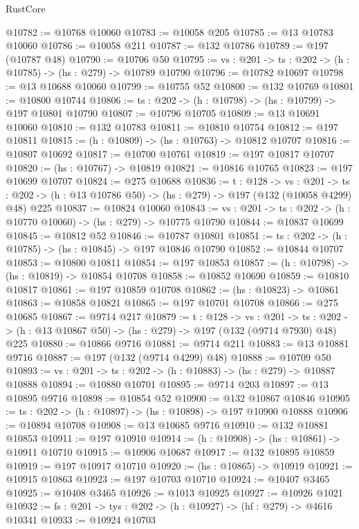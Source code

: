 \begin{lexlean}{RustCore}
\begin{coremodule}
@10782 := @10768 @10060
@10783 := @10058 @205
@10785 := @13 @10783 @10060
@10786 := @10058 @211
@10787 := @132 @10786
@10789 := @197 (@10787 @48)
@10790 := @10706 @50
@10795 := {vs : @201} -> {ts : @202} -> (h : @10785) -> (hs : @279) -> @10789 @10790
@10796 := @10782 @10697
@10798 := @13 @10688 @10060
@10799 := @10755 @52
@10800 := @132 @10769
@10801 := @10800 @10744
@10806 := {ts : @202} -> (h : @10798) -> (hs : @10799) -> @197 @10801 @10790
@10807 := @10796 @10705
@10809 := @13 @10691 @10060
@10810 := @132 @10783
@10811 := @10810 @10754
@10812 := @197 @10811
@10815 := (h : @10809) -> (hs : @10763) -> @10812 @10707
@10816 := @10807 @10692
@10817 := @10700 @10761
@10819 := @197 @10817 @10707
@10820 := (hs : @10767) -> @10819
@10821 := @10816 @10765
@10823 := @197 @10699 @10707
@10824 := @275 @10688
@10836 := {t : @128} ->
  {vs : @201} ->
  {ts : @202} -> (h : @13 @10786 @50) -> (hs : @279) -> @197 (@132 (@10058 @4299) @48) @225
@10837 := @10824 @10060
@10843 := {vs : @201} -> {ts : @202} -> (h : @10770 @10060) -> (hs : @279) -> @10775 @10790
@10844 := @10837 @10699
@10845 := @10812 @52
@10846 := @10787 @10801
@10851 := {ts : @202} -> (h : @10785) -> (hs : @10845) -> @197 @10846 @10790
@10852 := @10844 @10707
@10853 := @10800 @10811
@10854 := @197 @10853
@10857 := (h : @10798) -> (hs : @10819) -> @10854 @10708
@10858 := @10852 @10690
@10859 := @10810 @10817
@10861 := @197 @10859 @10708
@10862 := (hs : @10823) -> @10861
@10863 := @10858 @10821
@10865 := @197 @10701 @10708
@10866 := @275 @10685
@10867 := @9714 @217
@10879 := {t : @128} ->
  {vs : @201} ->
  {ts : @202} -> (h : @13 @10867 @50) -> (hs : @279) -> @197 (@132 (@9714 @7930) @48) @225
@10880 := @10866 @9716
@10881 := @9714 @211
@10883 := @13 @10881 @9716
@10887 := @197 (@132 (@9714 @4299) @48)
@10888 := @10709 @50
@10893 := {vs : @201} -> {ts : @202} -> (h : @10883) -> (hs : @279) -> @10887 @10888
@10894 := @10880 @10701
@10895 := @9714 @203
@10897 := @13 @10895 @9716
@10898 := @10854 @52
@10900 := @132 @10867 @10846
@10905 := {ts : @202} -> (h : @10897) -> (hs : @10898) -> @197 @10900 @10888
@10906 := @10894 @10708
@10908 := @13 @10685 @9716
@10910 := @132 @10881 @10853
@10911 := @197 @10910
@10914 := (h : @10908) -> (hs : @10861) -> @10911 @10710
@10915 := @10906 @10687
@10917 := @132 @10895 @10859
@10919 := @197 @10917 @10710
@10920 := (hs : @10865) -> @10919
@10921 := @10915 @10863
@10923 := @197 @10703 @10710
@10924 := @10407 @3465
@10925 := @10408 @3465
@10926 := @1013 @10925
@10927 := @10926 @1021
@10932 := {fs : @201} -> {tys : @202} -> (h : @10927) -> (hf : @279) -> @4616 @10341
@10933 := @10924 @10703

\end{coremodule}
\end{lexlean}
